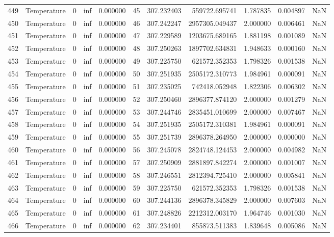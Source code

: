 \begin{tabular}{llrrrrrrrrr}
449 & Temperature & 0 & inf & 0.000000 & 45 & 307.232403 & 559722.695741 & 1.787835 & 0.004897 & NaN \\
450 & Temperature & 0 & inf & 0.000000 & 46 & 307.242247 & 2957305.049437 & 2.000000 & 0.006461 & NaN \\
451 & Temperature & 0 & inf & 0.000000 & 47 & 307.229589 & 1203675.689165 & 1.881198 & 0.001089 & NaN \\
452 & Temperature & 0 & inf & 0.000000 & 48 & 307.250263 & 1897702.634831 & 1.948633 & 0.000160 & NaN \\
453 & Temperature & 0 & inf & 0.000000 & 49 & 307.225750 & 621572.352353 & 1.798326 & 0.001538 & NaN \\
454 & Temperature & 0 & inf & 0.000000 & 50 & 307.251935 & 2505172.310773 & 1.984961 & 0.000091 & NaN \\
455 & Temperature & 0 & inf & 0.000000 & 51 & 307.235025 & 742418.052948 & 1.822306 & 0.006302 & NaN \\
456 & Temperature & 0 & inf & 0.000000 & 52 & 307.250460 & 2896377.874120 & 2.000000 & 0.001279 & NaN \\
457 & Temperature & 0 & inf & 0.000000 & 53 & 307.244746 & 2835451.010699 & 2.000000 & 0.007467 & NaN \\
458 & Temperature & 0 & inf & 0.000000 & 54 & 307.251935 & 2505172.310381 & 1.984961 & 0.000091 & NaN \\
459 & Temperature & 0 & inf & 0.000000 & 55 & 307.251739 & 2896378.264950 & 2.000000 & 0.000000 & NaN \\
460 & Temperature & 0 & inf & 0.000000 & 56 & 307.245078 & 2824748.124453 & 2.000000 & 0.004982 & NaN \\
461 & Temperature & 0 & inf & 0.000000 & 57 & 307.250909 & 2881897.842274 & 2.000000 & 0.001007 & NaN \\
462 & Temperature & 0 & inf & 0.000000 & 58 & 307.246551 & 2812394.725410 & 2.000000 & 0.005841 & NaN \\
463 & Temperature & 0 & inf & 0.000000 & 59 & 307.225750 & 621572.352353 & 1.798326 & 0.001538 & NaN \\
464 & Temperature & 0 & inf & 0.000000 & 60 & 307.244136 & 2896378.345829 & 2.000000 & 0.007603 & NaN \\
465 & Temperature & 0 & inf & 0.000000 & 61 & 307.248826 & 2212312.003170 & 1.964746 & 0.001030 & NaN \\
466 & Temperature & 0 & inf & 0.000000 & 62 & 307.234401 & 855873.511383 & 1.839648 & 0.005086 & NaN \\

\end{tabular}
